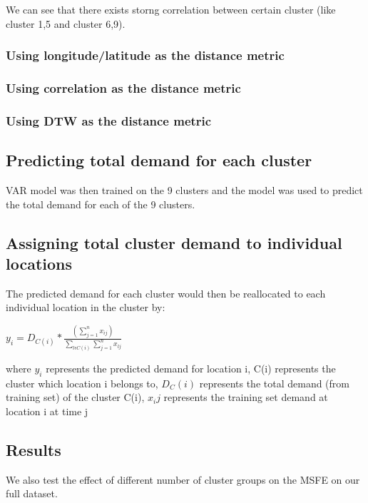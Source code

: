 \documentclass[12pt, letterpaper] {article}
\begin{document}
We can see that there exists storng correlation between certain cluster (like cluster 1,5 and cluster 6,9). 

\subsubsection{Using longitude/latitude as the distance metric}

\subsubsection{Using correlation as the distance metric}

\subsubsection{Using DTW as the distance metric}

\subsection{Predicting total demand for each cluster}

VAR model was then trained on the 9 clusters and the model was used to predict the total demand for each of the 9 clusters. 

\subsection{Assigning total cluster demand to individual locations}

The predicted demand for each cluster would then be reallocated to each individual location in the cluster by:

\begin{center}
    $\displaystyle y_{i} = D_{C(i)} * \frac{(\sum_{j=1}^{n}x_{ij})}{\sum_{l\epsilon C(i)}\sum_{j=1}^{n}x_{lj}}$
\end{center}

\noindent where $y_i$ represents the predicted demand for location i, C(i) represents the cluster which location i belongs to, $D_C(i)$ represents the total demand (from training set) of the cluster C(i), $x_ij$ represents the training set demand at location i at time j

\subsection{Results}

We also test the effect of different number of cluster groups on the MSFE on our full dataset. 
\end{document}
